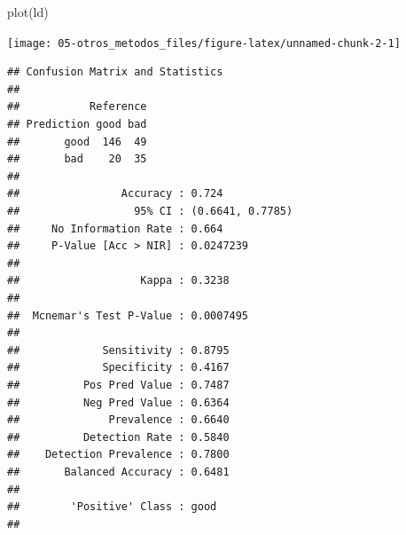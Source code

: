 \documentclass[
  spanish,
]{book}
\newenvironment{Shaded}{\begin{snugshade}}{\end{snugshade}}
\newcommand{\AttributeTok}[1]{\textcolor[rgb]{0.77,0.63,0.00}{#1}}
\newcommand{\FunctionTok}[1]{\textcolor[rgb]{0.00,0.00,0.00}{#1}}
\newcommand{\NormalTok}[1]{#1}
\newcommand{\OtherTok}[1]{\textcolor[rgb]{0.56,0.35,0.01}{#1}}
\newcommand{\SpecialCharTok}[1]{\textcolor[rgb]{0.00,0.00,0.00}{#1}}
\theoremstyle{break}
\theoremstyle{definition}
\theoremstyle{definition}
\theoremstyle{definition}
\theoremstyle{definition}
\theoremstyle{remark}
\begin{document}
\begin{Shaded}
\begin{Highlighting}[]
\FunctionTok{plot}\NormalTok{(ld)}
\end{Highlighting}
\end{Shaded}

\begin{center}\texttt{[image: 05-otros\_metodos\_files/figure-latex/unnamed-chunk-2-1]} \end{center}

\begin{Shaded}
\end{Shaded}

\begin{verbatim}
## Confusion Matrix and Statistics
## 
##           Reference
## Prediction good bad
##       good  146  49
##       bad    20  35
##                                           
##                Accuracy : 0.724           
##                  95% CI : (0.6641, 0.7785)
##     No Information Rate : 0.664           
##     P-Value [Acc > NIR] : 0.0247239       
##                                           
##                   Kappa : 0.3238          
##                                           
##  Mcnemar's Test P-Value : 0.0007495       
##                                           
##             Sensitivity : 0.8795          
##             Specificity : 0.4167          
##          Pos Pred Value : 0.7487          
##          Neg Pred Value : 0.6364          
##              Prevalence : 0.6640          
##          Detection Rate : 0.5840          
##    Detection Prevalence : 0.7800          
##       Balanced Accuracy : 0.6481          
##                                           
##        'Positive' Class : good            
## 
\end{verbatim}

\begin{Shaded}
\end{Shaded}
\end{document}
